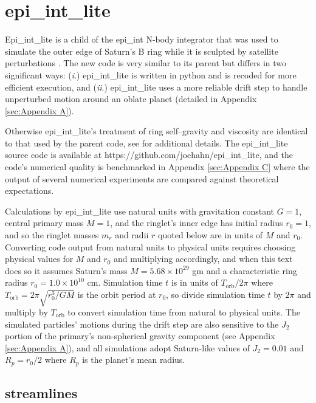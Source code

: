 \documentclass[preprint]{aastex62}
\begin{document}
\section{epi\_int\_lite}
\label{sec:epi_int_lite}

Epi\_int\_lite is a child of the epi\_int N-body integrator that was used to
simulate the outer edge of Saturn's B ring while it is sculpted by satellite perturbations
\citep{HS13}. The new code is very similar to its parent but differs in two significant ways:
({\it i}.) epi\_int\_lite is written in python and is recoded for more efficient execution, and
({\it ii}.) epi\_int\_lite uses a more reliable drift step to handle
unperturbed motion around an oblate planet (detailed in Appendix \ref{sec:Appendix A}).

Otherwise epi\_int\_lite's treatment of ring self--gravity and viscosity are identical
to that used by the parent code, see \cite{HS13} for additional details. The epi\_int\_lite 
source code is available at https://github.com/joehahn/epi\_int\_lite, and the
code's numerical quality is benchmarked in Appendix \ref{sec:Appendix C}
where the output of several numerical experiments are compared against theoretical expectations.

Calculations by epi\_int\_lite use natural units with gravitation constant $G=1$, 
central primary mass $M=1$, and the ringlet's inner edge has initial radius
$r_0=1$, and so the ringlet masses $m_r$ and radii $r$ quoted below are in units of $M$ and $r_0$.
Converting code output from natural units to physical units requires choosing	
physical values for $M$ and $r_0$ and multiplying accordingly, and when this text does so
it assumes Saturn's mass $M=5.68\times10^{29}$ gm and a characteristic
ring radius $r_0=1.0\times10^{10}$ cm. Simulation time $t$ is in units of $T_{\text{orb}}/2\pi$
where $T_{\text{orb}} = 2\pi\sqrt{r_0^3/GM}$ is the orbit period at $r_0$, 
so divide simulation time $t$ by $2\pi$ and multiply
by $T_{\text{orb}}$ to convert simulation time from natural to physical units.
The simulated particles' motions during the drift step are also
sensitive to the $J_2$ portion of the primary's non-spherical gravity component 
(see Appendix \ref{sec:Appendix A}), and all simulations
adopt Saturn-like values of $J_2=0.01$ and $R_p=r_0/2$ where $R_p$ is the planet's
mean radius.

\subsection{streamlines}
\label{subsec:streamlines}
\end{document}

